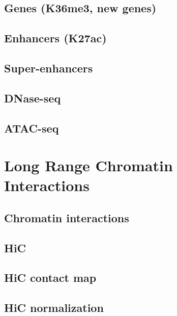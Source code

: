 \documentclass[]{book}
\begin{document}
\hypertarget{genes-k36me3-new-genes}{%
\section{Genes (K36me3, new genes)}\label{genes-k36me3-new-genes}}

\hypertarget{enhancers-k27ac}{%
\section{Enhancers (K27ac)}\label{enhancers-k27ac}}

\hypertarget{super-enhancers}{%
\section{Super-enhancers}\label{super-enhancers}}

\hypertarget{dnase-seq}{%
\section{DNase-seq}\label{dnase-seq}}

\hypertarget{atac-seq}{%
\section{ATAC-seq}\label{atac-seq}}

\hypertarget{lrci}{%
\chapter{Long Range Chromatin Interactions}\label{lrci}}

\hypertarget{chromatin-interactions}{%
\section{Chromatin interactions}\label{chromatin-interactions}}

\hypertarget{hic}{%
\section{HiC}\label{hic}}

\hypertarget{hic-contact-map}{%
\section{HiC contact map}\label{hic-contact-map}}

\hypertarget{hic-normalization}{%
\section{HiC normalization}\label{hic-normalization}}
\end{document}
